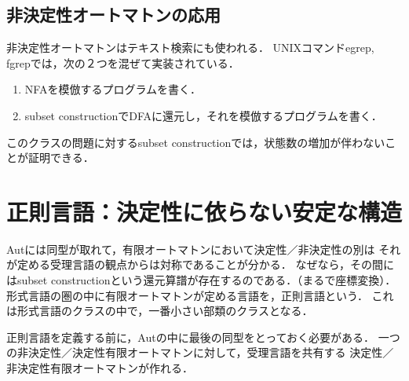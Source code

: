 \documentclass[uplatex, dvipdfmx]{jsreport}
\begin{document}
\subsection{非決定性オートマトンの応用}

\begin{application}
    非決定性オートマトンはテキスト検索にも使われる．
    UNIXコマンドegrep, fgrepでは，次の２つを混ぜて実装されている．
    \begin{enumerate}
        \item NFAを模倣するプログラムを書く．
        \item subset constructionでDFAに還元し，それを模倣するプログラムを書く．
    \end{enumerate}
    このクラスの問題に対するsubset constructionでは，状態数の増加が伴わないことが証明できる．
\end{application}

\section{正則言語：決定性に依らない安定な構造}

\begin{screen}
    Autには同型が取れて，有限オートマトンにおいて決定性／非決定性の別は
    それが定める受理言語の観点からは対称であることが分かる．
    なぜなら，その間にはsubset constructionという還元算譜が存在するのである．（まるで座標変換）．
    形式言語の圏の中に有限オートマトンが定める言語を，正則言語という．
    これは形式言語のクラスの中で，一番小さい部類のクラスとなる．
\end{screen}

正則言語を定義する前に，Autの中に最後の同型をとっておく必要がある．
一つの非決定性／決定性有限オートマトンに対して，受理言語を共有する
決定性／非決定性有限オートマトンが作れる．
\end{document}
